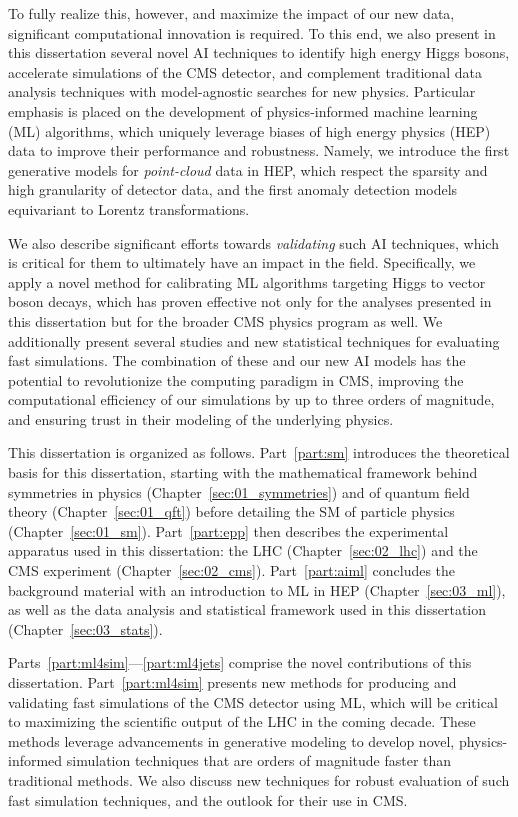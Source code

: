 To fully realize this, however, and maximize the impact of our new data, significant computational innovation is required.
To this end, we also present in this dissertation several novel AI techniques to identify high energy Higgs bosons, accelerate simulations of the CMS detector, and complement traditional data analysis techniques with model-agnostic searches for new physics.
Particular emphasis is placed on the development of physics-informed machine learning (ML) algorithms, which uniquely leverage biases of high energy physics (HEP) data to improve their performance and robustness.
Namely, we introduce the first generative models for \textit{point-cloud} data in HEP, which respect the sparsity and high granularity of detector data, and the first anomaly detection models equivariant to Lorentz transformations.

We also describe significant efforts towards \textit{validating} such AI techniques, which is critical for them to ultimately have an impact in the field.
Specifically, we apply a novel method for calibrating ML algorithms targeting Higgs to vector boson decays, which has proven effective not only for the analyses presented in this dissertation but for the broader CMS physics program as well.
We additionally present several studies and new statistical techniques for evaluating fast simulations.
The combination of these and our new AI models has the potential to revolutionize the computing paradigm in CMS, improving the computational efficiency of our simulations by up to three orders of magnitude, and ensuring trust in their modeling of the underlying physics.


This dissertation is organized as follows.
Part~\ref{part:sm} introduces the theoretical basis for this dissertation, starting with the mathematical framework behind symmetries in physics (Chapter~\ref{sec:01_symmetries}) and of quantum field theory (Chapter~\ref{sec:01_qft}) before detailing the SM of particle physics (Chapter~\ref{sec:01_sm}).
Part~\ref{part:epp} then describes the experimental apparatus used in this dissertation: the LHC (Chapter~\ref{sec:02_lhc}) and the CMS experiment (Chapter~\ref{sec:02_cms}).
Part~\ref{part:aiml} concludes the background material with an introduction to ML in HEP (Chapter~\ref{sec:03_ml}), as well as the data analysis and statistical framework used in this dissertation (Chapter~\ref{sec:03_stats}).


Parts~\ref{part:ml4sim}---\ref{part:ml4jets} comprise the novel contributions of this dissertation.
Part~\ref{part:ml4sim} presents new methods for producing and validating fast simulations of the CMS detector using ML, which will be critical to maximizing the scientific output of the LHC in the coming decade.
These methods leverage advancements in generative modeling to develop novel, physics-informed simulation techniques that are orders of magnitude faster than traditional methods.
We also discuss new techniques for robust evaluation of such fast simulation techniques, and the outlook for their use in CMS.

